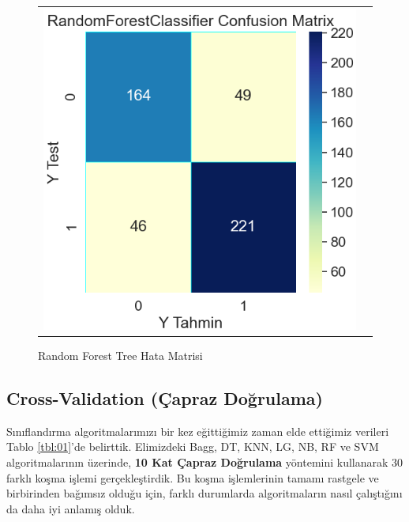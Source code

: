 \documentclass[conference]{IEEEtran}
\begin{document}
\begin{figure}[!h]
	\centering
	\begin{center}
		\begin{tabular}{cc}
			\includegraphics[scale=0.4]{pictures/pic_16.png}&
		\end{tabular}
	\end{center}
	\caption{Random Forest Tree Hata Matrisi}
	\label{fig:16}
\end{figure}
\pagebreak



\newpage
\subsection{\textbf{Cross-Validation (Çapraz Doğrulama)}}
\quad Sınıflandırma algoritmalarımızı bir kez eğittiğimiz zaman elde ettiğimiz verileri Tablo \ref{tbl:01}'de belirttik. Elimizdeki  Bagg, DT, KNN, LG, NB, RF ve SVM algoritmalarının üzerinde, \textbf{10 Kat Çapraz Doğrulama} yöntemini kullanarak 30 farklı koşma işlemi gerçekleştirdik. Bu koşma işlemlerinin tamamı rastgele ve birbirinden bağımsız olduğu için, farklı durumlarda algoritmaların nasıl çalıştığını da daha iyi anlamış olduk.
\end{document}

